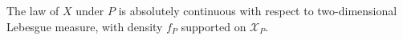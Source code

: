 The law of \(X\) under \(P\) is absolutely continuous with respect to two-dimensional Lebesgue measure, with density \(f_P\) supported on \(\mathcal X_P\).